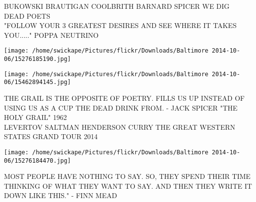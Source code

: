 \documentclass[10pt,letterpaper]{article}
\begin{document}
BUKOWSKI BRAUTIGAN COOLBRITH BARNARD SPICER WE DIG DEAD POETS\\
"FOLLOW YOUR 3 GREATEST DESIRES AND SEE WHERE IT TAKES YOU....." POPPA NEUTRINO\\
\pagebreak

\texttt{[image: /home/swickape/Pictures/flickr/Downloads/Baltimore 2014-10-06/15276185190.jpg]}

\vspace{0.25in}
\texttt{[image: /home/swickape/Pictures/flickr/Downloads/Baltimore 2014-10-06/15462894145.jpg]}

THE GRAIL IS THE OPPOSITE OF POETRY.  FILLS US UP INSTEAD OF USING US AS A CUP THE DEAD DRINK FROM.  {-} JACK SPICER "THE HOLY GRAIL" 1962\\
LEVERTOV SALTMAN HENDERSON CURRY THE GREAT WESTERN STATES GRAND TOUR 2014\\
\pagebreak

\texttt{[image: /home/swickape/Pictures/flickr/Downloads/Baltimore 2014-10-06/15276184470.jpg]}

MOST PEOPLE HAVE NOTHING TO SAY.  SO, THEY SPEND THEIR TIME THINKING OF WHAT THEY WANT TO SAY.  AND THEN THEY WRITE IT DOWN LIKE THIS." {-} FINN MEAD\\
\pagebreak
\end{document}
